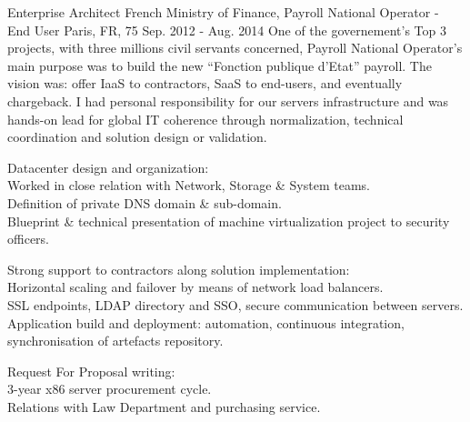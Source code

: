 \begin{cventries}
  \cventry
    {Enterprise Architect} %
    {French Ministry of Finance, Payroll National Operator - End User} %
    {Paris, FR, 75} %
    {Sep. 2012 - Aug. 2014} %
{
One of the governement's Top 3 projects, with three millions civil servants concerned, Payroll National Operator’s main purpose was to build the new “Fonction publique d’Etat” payroll.
The vision was: offer IaaS to contractors, SaaS to end-users, and eventually chargeback.
I had personal responsibility for our servers infrastructure and was hands-on lead for global IT coherence through normalization, technical coordination and solution design or validation.
} %
{
      \begin{cvitems} %
        \item {Datacenter design and organization:\\Worked in close relation with Network, Storage \& System teams.\\Definition of private DNS domain \& sub-domain.\\Blueprint \& technical presentation of machine virtualization project to security officers.}
        \item {Strong support to contractors along solution implementation:\\Horizontal scaling and failover by means of network load balancers.\\SSL endpoints, LDAP directory and SSO, secure communication between servers.\\Application build and deployment: automation, continuous integration, synchronisation of artefacts repository.}
        \item {Request For Proposal writing:\\3-year x86 server procurement cycle.\\Relations with Law Department and purchasing service.}
      \end{cvitems}
} %


\end{cventries}
